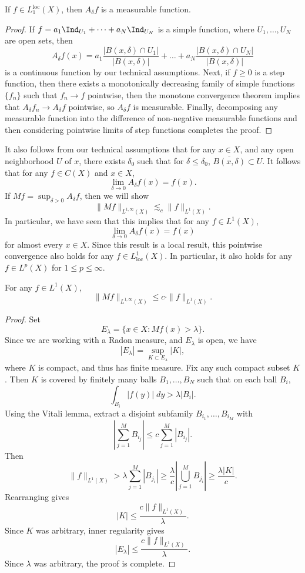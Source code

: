 \begin{lemma}
  If $f \in L_1^{\text{loc}}(X)$, then $A_\delta f$ is a measurable function.
\end{lemma}
\begin{proof}
  If $f = a_1 \Ind_{U_1} + \dots + a_N \Ind_{U_N}$ is a simple function, where $U_1,\dots,U_N$ are open sets, then
  \[ A_\delta f(x) = a_1 \frac{|B(x,\delta) \cap U_1|}{|B(x,\delta)|} + \dots + a_N \frac{|B(x,\delta) \cap U_N|}{|B(x,\delta)|} \]
  is a continuous function by our technical assumptions. Next, if $f \geq 0$ is a step function, then there exists a monotonically decreasing family of simple functions $\{ f_n \}$ such that $f_n \to f$ pointwise, then the monotone convergence theorem implies that $A_\delta f_n \to A_\delta f$ pointwise, so $A_\delta f$ is measurable. Finally, decomposing any measurable function into the difference of non-negative measurable functions and then considering pointwise limits of step functions completes the proof.
\end{proof}

It also follows from our technical assumptions that for any $x \in X$, and any open neighborhood $U$ of $x$, there exists $\delta_0$ such that for $\delta \leq \delta_0$, $\overline{B(x,\delta)} \subset U$. It follows that for any $f \in C(X)$ and $x \in X$,
%
\[ \lim_{\delta \to 0} A_\delta f(x) = f(x). \]
%
If $Mf = \sup_{\delta > 0} A_\delta f$, then we will show
%
\[ \| Mf \|_{L^{1,\infty}(X)} \lesssim_c \| f \|_{L^1(X)}. \]
%
In particular, we have seen that this implies that for any $f \in L^1(X)$,
%
\[ \lim_{\delta \to 0} A_\delta f(x) = f(x) \]
%
for almost every $x \in X$. Since this result is a local result, this pointwise convergence also holds for any $f \in L^1_{\text{loc}}(X)$. In particular, it also holds for any $f \in L^p(X)$ for $1 \leq p \leq \infty$.

\begin{theorem}
  For any $f \in L^1(X)$,
  \[ \| Mf \|_{L^{1,\infty}(X)} \leq c \cdot \| f \|_{L^1(X)}. \]
\end{theorem}
\begin{proof}
  Set
  \[ E_\lambda = \{ x \in X: Mf(x) > \lambda \}. \]
  Since we are working with a Radon measure, and $E_\lambda$ is open, we have
  \[ |E_\lambda| = \sup_{K \subset E_\lambda} |K|, \]
  where $K$ is compact, and thus has finite measure. Fix any such compact subset $K$. Then $K$ is covered by finitely many balls $B_1,\dots,B_N$ such that on each ball $B_i$,
  \[ \int_{B_i} |f(y)|\; dy > \lambda |B_i|. \]
  Using the Vitali lemma, extract a disjoint subfamily $B_{i_1},\dots, B_{i_M}$ with
  \[ \left| \sum_{j = 1}^M B_{i_j} \right| \leq c \sum_{j = 1}^M |B_{i_j}|. \]
  Then
  \[ \| f \|_{L^1(X)} > \lambda \sum_{j = 1}^M |B_{j_i}| \geq \frac{\lambda}{c} \left| \bigcup_{j = 1}^M B_{j_i} \right| \geq \frac{\lambda |K|}{c}. \]
  Rearranging gives
  \[ |K| \leq \frac{c \| f \|_{L^1(X)}}{\lambda}. \]
  Since $K$ was arbitrary, inner regularity gives
  \[ |E_\lambda| \leq \frac{c \| f \|_{L^1(X)}}{\lambda}. \]
  Since $\lambda$ was arbitrary, the proof is complete.
\end{proof}


